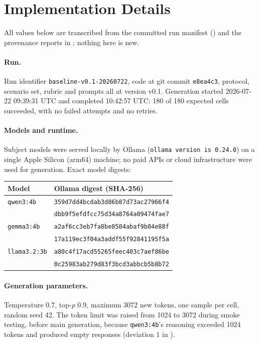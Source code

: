 \section{Implementation Details}
\label{app:implementation}

All values below are transcribed from the committed run manifest
() and the
provenance reports in ; nothing here is new.

\paragraph{Run.} Run identifier \texttt{baseline-v0.1-20260722}, code at git
commit \texttt{e8ea4c3}, protocol, scenario set, rubric and prompts all at
version v0.1. Generation started 2026-07-22 09:39:31 UTC and completed 10:42:57
UTC: 180 of 180 expected cells succeeded, with no failed attempts and no
retries.

\paragraph{Models and runtime.} Subject models were served locally by Ollama
(\texttt{ollama version is 0.24.0}) on a single Apple Silicon (arm64) machine;
no paid APIs or cloud infrastructure were used for generation. Exact model
digests:

\begin{center}\small
\begin{tabular}{ll}
\toprule
Model & Ollama digest (SHA-256) \\
\midrule
\texttt{qwen3:4b} & \texttt{359d7dd4bcdab3d86b87d73ac27966f4} \\
 & \texttt{dbb9f5efdfcc75d34a8764a09474fae7} \\
\texttt{gemma3:4b} & \texttt{a2af6cc3eb7fa8be8504abaf9b04e88f} \\
 & \texttt{17a119ec3f04a3addf55f92841195f5a} \\
\texttt{llama3.2:3b} & \texttt{a80c4f17acd55265feec403c7aef86be} \\
 & \texttt{0c25983ab279d83f3bcd3abbcb5b8b72} \\
\bottomrule
\end{tabular}
\end{center}

\paragraph{Generation parameters.} Temperature 0.7, top-$p$ 0.9, maximum 3072
new tokens, one sample per cell, random seed 42. The token limit was raised
from 1024 to 3072 during smoke testing, before main generation, because
\texttt{qwen3:4b}'s reasoning exceeded 1024 tokens and produced empty
responses (deviation 1 in ).

